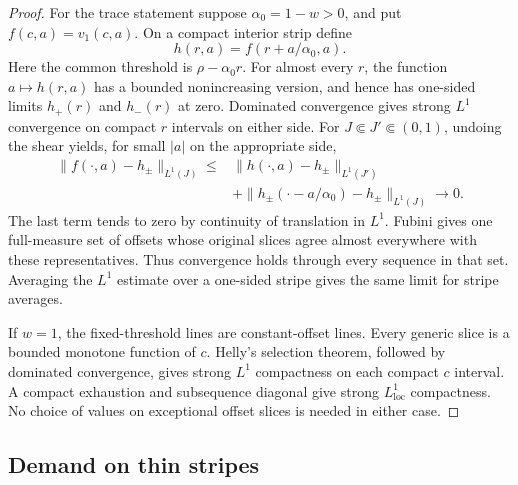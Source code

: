 \begin{proof}
For the trace statement suppose $\alpha_0=1-w>0$, and put
$f(c,a)=v_1(c,a)$.  On a compact interior strip define
\[
 h(r,a)=f(r+a/\alpha_0,a).
\]
Here the common threshold is $\rho-\alpha_0r$.  For almost every $r$,
the function $a\mapsto h(r,a)$ has a bounded nonincreasing version,
and hence has one-sided limits $h_+(r)$ and $h_-(r)$ at zero.
Dominated convergence gives strong $L^1$ convergence on compact
$r$ intervals on either side.  For $J\Subset J'\Subset(0,1)$,
undoing the shear yields, for small $|a|$ on the appropriate side,
\begin{align*}
 \|f(\cdot,a)-h_\pm\|_{L^1(J)}
 \le{}&\|h(\cdot,a)-h_\pm\|_{L^1(J')}\\
      &+\|h_\pm(\cdot-a/\alpha_0)-h_\pm\|_{L^1(J)}\longrightarrow0.
\end{align*}
The last term tends to zero by continuity of translation in $L^1$.
Fubini gives one full-measure set of offsets whose original slices
agree almost everywhere with these representatives.  Thus convergence
holds through every sequence in that set.  Averaging the $L^1$
estimate over a one-sided stripe gives the same limit for stripe
averages.

If $w=1$, the fixed-threshold lines are constant-offset lines.
Every generic slice is a bounded monotone function of $c$.  Helly's
selection theorem, followed by dominated convergence, gives strong
$L^1$ compactness on each compact $c$ interval.  A compact exhaustion
and subsequence diagonal give strong $L^1_{\mathrm{loc}}$ compactness.
No choice of values on exceptional offset slices is needed in either
case.
\end{proof}

\subsection{Demand on thin stripes}

